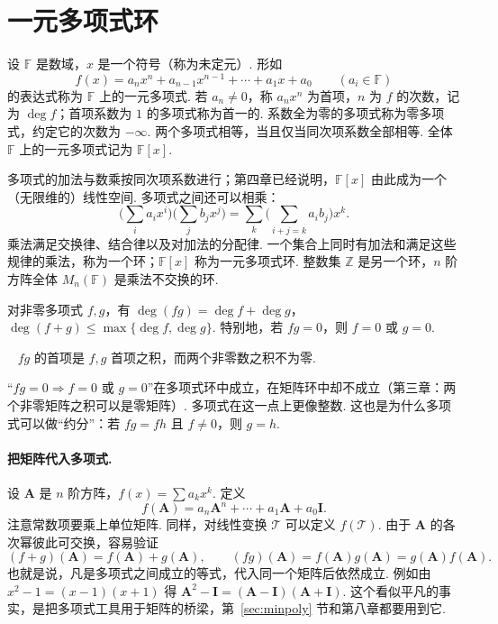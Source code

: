 \documentclass[lang=cn,10.5pt,scheme=chinese,toc=twocol,section,chinesefont=nofont,
twoside,citestyle=gb7714-2015,bibstyle=gb7714-2015]{elegantbook}
\DeclareRobustCommand{\textbf}[1]{{\lnsemiboldlatin\lnsemiboldcjk #1}}
\newcommand{\vv}[1]{\boldsymbol{#1}}
\numberwithin{equation}{section}   %
\newcommand{\hB}{\texorpdfstring{\textdagger}{†}}
\newcommand*{\lnlabel}[1]{{\sffamily\bfseries\color{black}#1}}
\renewenvironment{proof}{%
	\par\noindent\lnlabel{\proofname}\;\ \color{black!90}\cfs}{\par}
\begin{document}
\section{\hB 一元多项式环}\label{sec:polyring}

\begin{definition}
  设 $\mathbb{F}$ 是数域，$x$ 是一个符号（称为\textbf{未定元}）. 形如
  \[f(x)=a_nx^n+a_{n-1}x^{n-1}+\cdots+a_1x+a_0\qquad(a_i\in\mathbb{F})\]
  的表达式称为 $\mathbb{F}$ 上的\textbf{一元多项式}. 若 $a_n\ne0$，称 $a_nx^n$ 为\textbf{首项}，$n$ 为 $f$ 的\textbf{次数}，记为 $\deg f$；首项系数为 $1$ 的多项式称为\textbf{首一}的. 系数全为零的多项式称为\textbf{零多项式}，约定它的次数为 $-\infty$. 两个多项式相等，当且仅当同次项系数全部相等. 全体 $\mathbb{F}$ 上的一元多项式记为 $\mathbb{F}[x]$.
\end{definition}

多项式的加法与数乘按同次项系数进行；第四章已经说明，$\mathbb{F}[x]$ 由此成为一个（无限维的）线性空间. 多项式之间还可以\textbf{相乘}：
\[\Big(\sum_i a_ix^i\Big)\Big(\sum_j b_jx^j\Big)=\sum_k\Big(\sum_{i+j=k}a_ib_j\Big)x^k.\]
乘法满足交换律、结合律以及对加法的分配律. 一个集合上同时有加法和满足这些规律的乘法，称为一个\textbf{环}；$\mathbb{F}[x]$ 称为\textbf{一元多项式环}. 整数集 $\mathbb{Z}$ 是另一个环，$n$ 阶方阵全体 $M_n(\mathbb{F})$ 是乘法不交换的环.

\begin{proposition}
  \label{prop:degree}
  对非零多项式 $f,g$，有 $\deg(fg)=\deg f+\deg g$，$\deg(f+g)\le\max\{\deg f,\deg g\}$. 特别地，若 $fg=0$，则 $f=0$ 或 $g=0$.
\end{proposition}
\begin{proof}
  $fg$ 的首项是 $f,g$ 首项之积，而两个非零数之积不为零.
\end{proof}

\begin{pitfallbox}
  “$fg=0\Rightarrow f=0$ 或 $g=0$”在多项式环中成立，在矩阵环中却不成立（第三章：两个非零矩阵之积可以是零矩阵）. 多项式在这一点上更像整数. 这也是为什么多项式可以做“约分”：若 $fg=fh$ 且 $f\ne0$，则 $g=h$.
\end{pitfallbox}

\paragraph*{把矩阵代入多项式.} 设 $\vv A$ 是 $n$ 阶方阵，$f(x)=\sum a_kx^k$. 定义
\[f(\vv A)=a_n\vv A^n+\cdots+a_1\vv A+a_0\vv I.\]
注意常数项要乘上单位矩阵. 同样，对线性变换 $\mathscr T$ 可以定义 $f(\mathscr T)$. 由于 $\vv A$ 的各次幂彼此可交换，容易验证
\[(f+g)(\vv A)=f(\vv A)+g(\vv A),\qquad (fg)(\vv A)=f(\vv A)g(\vv A)=g(\vv A)f(\vv A).\]
也就是说，凡是多项式之间成立的等式，代入同一个矩阵后依然成立. 例如由 $x^2-1=(x-1)(x+1)$ 得 $\vv A^2-\vv I=(\vv A-\vv I)(\vv A+\vv I)$. 这个看似平凡的事实，是把多项式工具用于矩阵的桥梁，第~\ref{sec:minpoly} 节和第八章都要用到它.
\end{document}
